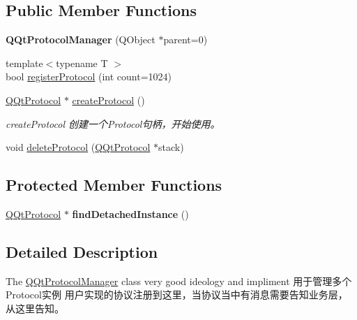 \subsection*{Public Member Functions}
\begin{DoxyCompactItemize}
\item 
\mbox{\label{class_q_qt_protocol_manager_a8dda4189f004e2013de7a51039319efa}} 
{\bfseries Q\+Qt\+Protocol\+Manager} (Q\+Object $\ast$parent=0)
\item 
{\footnotesize template$<$typename T $>$ }\\bool \mbox{\hyperlink{class_q_qt_protocol_manager_a82e23b25b4991b6b04969bab7645cb1a}{register\+Protocol}} (int count=1024)
\item 
\mbox{\hyperlink{class_q_qt_protocol}{Q\+Qt\+Protocol}} $\ast$ \mbox{\hyperlink{class_q_qt_protocol_manager_ad9338cb29423bcb27e028b2fcc172111}{create\+Protocol}} ()
\begin{DoxyCompactList}\small\item\em create\+Protocol 创建一个\+Protocol句柄，开始使用。 \end{DoxyCompactList}\item 
void \mbox{\hyperlink{class_q_qt_protocol_manager_a144c24a9597d4fd2618b20f3389497f1}{delete\+Protocol}} (\mbox{\hyperlink{class_q_qt_protocol}{Q\+Qt\+Protocol}} $\ast$stack)
\end{DoxyCompactItemize}
\subsection*{Protected Member Functions}
\begin{DoxyCompactItemize}
\item 
\mbox{\label{class_q_qt_protocol_manager_ad613f34535b4b40b189d11c40d354143}} 
\mbox{\hyperlink{class_q_qt_protocol}{Q\+Qt\+Protocol}} $\ast$ {\bfseries find\+Detached\+Instance} ()
\end{DoxyCompactItemize}


\subsection{Detailed Description}
The \mbox{\hyperlink{class_q_qt_protocol_manager}{Q\+Qt\+Protocol\+Manager}} class very good ideology and impliment 用于管理多个\+Protocol实例 用户实现的协议注册到这里，当协议当中有消息需要告知业务层，从这里告知。 

